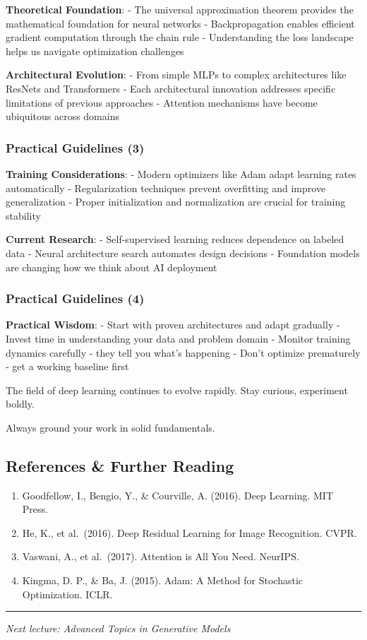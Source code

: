 \documentclass[
]{article}
\providecommand{\tightlist}{%
  \setlength{\itemsep}{0pt}\setlength{\parskip}{0pt}}
\begin{document}
\textbf{Theoretical Foundation}: - The universal approximation theorem
provides the mathematical foundation for neural networks -
Backpropagation enables efficient gradient computation through the chain
rule - Understanding the loss landscape helps us navigate optimization
challenges

\textbf{Architectural Evolution}: - From simple MLPs to complex
architectures like ResNets and Transformers - Each architectural
innovation addresses specific limitations of previous approaches -
Attention mechanisms have become ubiquitous across domains

\subsubsection{Practical Guidelines (3)}\label{practical-guidelines-3}

\textbf{Training Considerations}: - Modern optimizers like Adam adapt
learning rates automatically - Regularization techniques prevent
overfitting and improve generalization - Proper initialization and
normalization are crucial for training stability

\textbf{Current Research}: - Self-supervised learning reduces dependence
on labeled data - Neural architecture search automates design decisions
- Foundation models are changing how we think about AI deployment

\subsubsection{Practical Guidelines (4)}\label{practical-guidelines-4}

\textbf{Practical Wisdom}: - Start with proven architectures and adapt
gradually - Invest time in understanding your data and problem domain -
Monitor training dynamics carefully - they tell you what's happening -
Don't optimize prematurely - get a working baseline first

The field of deep learning continues to evolve rapidly. Stay curious,
experiment boldly.

Always ground your work in solid fundamentals.

\subsection{References \& Further
Reading}\label{references-further-reading}

\begin{enumerate}
\def\labelenumi{\arabic{enumi}.}
\tightlist
\item
  Goodfellow, I., Bengio, Y., \& Courville, A. (2016). Deep Learning.
  MIT Press.
\item
  He, K., et al.~(2016). Deep Residual Learning for Image Recognition.
  CVPR.
\item
  Vaswani, A., et al.~(2017). Attention is All You Need. NeurIPS.
\item
  Kingma, D. P., \& Ba, J. (2015). Adam: A Method for Stochastic
  Optimization. ICLR.
\end{enumerate}

\begin{center}\rule{0.5\linewidth}{0.5pt}\end{center}

\emph{Next lecture: Advanced Topics in Generative Models}
\end{document}
